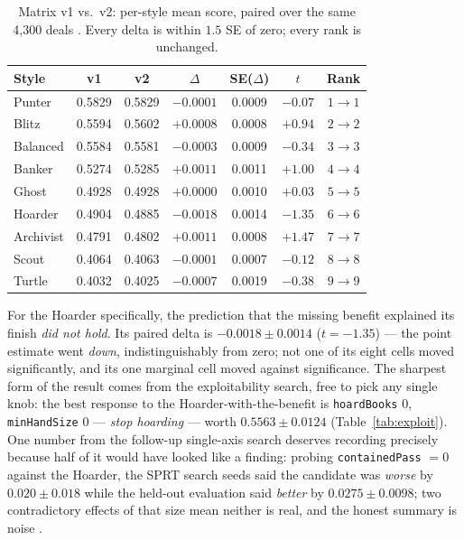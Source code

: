 \documentclass[11pt]{article}
\newcommand{\code}[1]{\texttt{#1}}
\begin{document}
\begin{table}[t]
\centering
\caption{Matrix v1 vs.\ v2: per-style mean score, paired over the same 4{,}300 deals
\cite{styles}. Every delta is within $1.5$ SE of zero; every rank is unchanged.}
\label{tab:v1v2}
\footnotesize
\begin{tabular}{@{}lcccccc@{}}
\toprule
Style & v1 & v2 & $\Delta$ & SE($\Delta$) & $t$ & Rank \\
\midrule
Punter    & 0.5829 & 0.5829 & $-0.0001$ & 0.0009 & $-0.07$ & $1 \to 1$ \\
Blitz     & 0.5594 & 0.5602 & $+0.0008$ & 0.0008 & $+0.94$ & $2 \to 2$ \\
Balanced  & 0.5584 & 0.5581 & $-0.0003$ & 0.0009 & $-0.34$ & $3 \to 3$ \\
Banker    & 0.5274 & 0.5285 & $+0.0011$ & 0.0011 & $+1.00$ & $4 \to 4$ \\
Ghost     & 0.4928 & 0.4928 & $+0.0000$ & 0.0010 & $+0.03$ & $5 \to 5$ \\
Hoarder   & 0.4904 & 0.4885 & $-0.0018$ & 0.0014 & $-1.35$ & $6 \to 6$ \\
Archivist & 0.4791 & 0.4802 & $+0.0011$ & 0.0008 & $+1.47$ & $7 \to 7$ \\
Scout     & 0.4064 & 0.4063 & $-0.0001$ & 0.0007 & $-0.12$ & $8 \to 8$ \\
Turtle    & 0.4032 & 0.4025 & $-0.0007$ & 0.0019 & $-0.38$ & $9 \to 9$ \\
\bottomrule
\end{tabular}
\end{table}

For the Hoarder specifically, the prediction that the missing benefit explained its finish
\emph{did not hold}. Its paired delta is $-0.0018 \pm 0.0014$ ($t = -1.35$) --- the point
estimate went \emph{down}, indistinguishably from zero; not one of its eight cells moved
significantly, and its one marginal cell moved against significance. The sharpest form of the
result comes from the exploitability search, free to pick any single knob: the best response
to the Hoarder-with-the-benefit is \code{hoardBooks} 0, \code{minHandSize} 0 --- \emph{stop
hoarding} --- worth $0.5563 \pm 0.0124$ (Table~\ref{tab:exploit}). One number from the
follow-up single-axis search deserves recording precisely because half of it would have
looked like a finding: probing \code{containedPass} $= 0$ against the Hoarder, the SPRT
search seeds said the candidate was \emph{worse} by $0.020 \pm 0.018$ while the held-out
evaluation said \emph{better} by $0.0275 \pm 0.0098$; two contradictory effects of that size
mean neither is real, and the honest summary is noise \cite{styles}.
\end{document}
